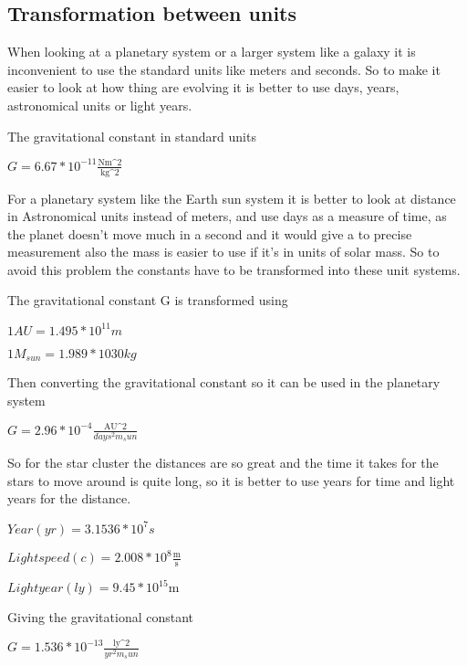 
\subsection{Transformation between units}

When looking at a planetary system or a larger system like a galaxy it is inconvenient to use the standard units like meters and seconds. So to make it easier to look at how thing are evolving it is better to use days, years, astronomical units or light years.

The gravitational constant in standard units


$ G = 6.67*10^{-11} \frac{\textrm{Nm^2}}{\textrm{kg^2}}$ 
 

For a planetary system like the Earth sun system it is better to look at distance in Astronomical units instead of meters, and use days as a measure of time, as the planet doesn't move much in a second and it would give a to precise measurement also the mass is easier to use if it's in units of solar mass. So to avoid this problem the constants have to be transformed into these unit systems. 

The gravitational constant G is transformed using

$1 AU = 1.495*10^{11} m$ 

$1 M_{sun} = 1.989 * 10 {30} kg$

Then converting the gravitational constant so it can be used in the planetary system

$ G = 2.96* 10^{-4} \frac{\textrm{AU^2}}{days^2m_sun}$ 


So for the star cluster the distances are so great and the time it takes for the stars to move around is quite long, so it is better to use years for time and light years for the distance. 

$Year (yr) = 3.1536*10^7s$

$Light speed (c) = 2.008*10^8 \frac{\textrm{m}}{\textrm{s}}$

$Light year (ly)= 9.45 * 10^15 \textrm{m} $ 

Giving the gravitational constant

$G = 1.536* 10^{-13} \frac{\textrm{ly^2}}{yr^2m_sun}$

